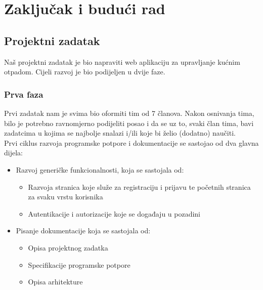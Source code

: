 \chapter{Zaključak i budući rad}
		
%		
%		
	 
		 \section{Projektni zadatak}
		 
		 Naš projektni zadatak je bio napraviti web aplikaciju za upravljanje kućnim otpadom. Cijeli razvoj je bio podijeljen u dvije faze.
		 
		 \subsection{Prva faza}
		 
		 Prvi zadatak nam je svima bio oformiti tim od 7 članova. Nakon osnivanja tima, bilo je potrebno ravnomjerno podijeliti posao i da se uz to, svaki član tima, bavi zadatcima u kojima se najbolje snalazi i/ili koje bi želio (dodatno) naučiti.\\
		 
		 Prvi ciklus razvoja programske potpore i dokumentacije se sastojao od dva glavna dijela: 
		 \begin{itemize}
		 	\item Razvoj generičke funkcionalnosti, koja se sastojala od:
		 	\begin{itemize}
		 		\item Razvoja stranica koje služe za registraciju i prijavu te početnih stranica za svaku vrstu korisnika
		 		\item Autentikacije i autorizacije koje se događaju u pozadini
		 	\end{itemize}
	 	\item Pisanje dokumentacije koja se sastojala od:
	 	\begin{itemize}
	 		\item Opisa projektnog zadatka
	 		\item Specifikacije programske potpore
	 		\item Opisa arhitekture
	 	\end{itemize}
		 \end{itemize}
	 
